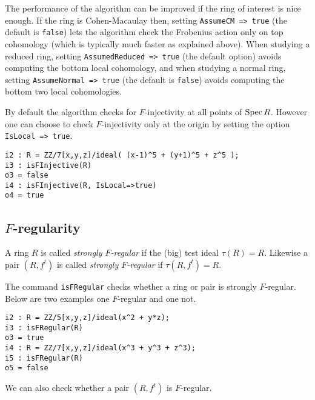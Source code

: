 \documentclass{amsart}
\begin{document}
The performance of the algorithm can be improved if the ring of interest is
nice enough. If the ring is Cohen-Macaulay then, setting \texttt{AssumeCM =>
true} (the default is \texttt{false}) lets the algorithm check the Frobenius action only on top cohomology
(which is typically much faster as explained above).
When studying a reduced ring,  setting \texttt{AssumedReduced => true} (the default option) avoids
computing the bottom local cohomology, and when studying a normal ring, setting
\texttt{AssumeNormal => true} (the default is \texttt{false}) avoids computing the bottom two local
cohomologies. 

By default the algorithm checks for $F$-injectivity at all points of $\operatorname{{Spec}} R$.  However one
can choose to check $F$-injectivity only at the origin by setting the
option \texttt{IsLocal => true}.

\medskip
\begin{verbatim}
i2 : R = ZZ/7[x,y,z]/ideal( (x-1)^5 + (y+1)^5 + z^5 );
i3 : isFInjective(R)
o3 = false
i4 : isFInjective(R, IsLocal=>true)
o4 = true
\end{verbatim}
\medskip

\subsection{$F$-regularity}

\begin{definition}
A ring $R$ is called \emph{strongly $F$-regular} if the (big) test ideal $\tau(R) = R$.  Likewise a pair $(R, f^t)$ is called \emph{strongly $F$-regular} if $\tau(R, f^t) = R$.
\end{definition}


The command \texttt{isFRegular} checks whether a ring or pair is strongly
$F$-regular. Below are two examples one $F$-regular and one not.


\medskip
\begin{verbatim}
i2 : R = ZZ/5[x,y,z]/ideal(x^2 + y*z);
i3 : isFRegular(R)
o3 = true
i4 : R = ZZ/7[x,y,z]/ideal(x^3 + y^3 + z^3);
i5 : isFRegular(R)
o5 = false
\end{verbatim}
\medskip

We can also check whether a pair $(R, f^t)$ is $F$-regular.
\end{document}
